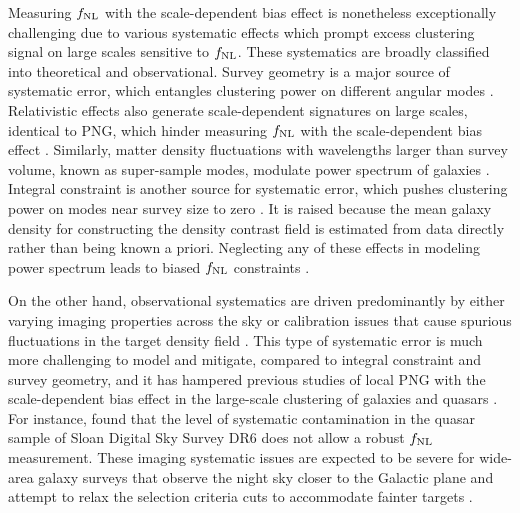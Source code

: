Measuring $f_{\rm NL}$ with the scale-dependent bias effect is nonetheless exceptionally challenging due to various systematic effects which prompt excess clustering signal on large scales sensitive to $f_{\rm NL}$. These systematics are broadly classified into theoretical and observational. Survey geometry is a major source of systematic error, which entangles clustering power on different angular modes \citep{beutler2014clustering,wilson2017rapid}. Relativistic effects also generate scale-dependent signatures on large scales, identical to PNG, which hinder measuring $f_{\rm NL}$ with the scale-dependent bias effect \citep{wang2020}. Similarly, matter density fluctuations with wavelengths larger than survey volume, known as super-sample modes, modulate power spectrum of galaxies \citep{castorina2020JCAP}. Integral constraint is another source for systematic error, which pushes clustering power on modes near survey size to zero \citep{peacock1991large,de2019integral}. It is raised because the mean galaxy density for constructing the density contrast field is estimated from data directly rather than being known a priori. Neglecting any of these effects in modeling power spectrum leads to biased $f_{\rm NL}$ constraints \citep[see, e.g.,][]{riquelme2022primordial}. 

On the other hand, observational systematics are driven predominantly by either varying imaging properties across the sky \citep{ross2011} or calibration issues that cause spurious fluctuations in the target density field \citep{huterer2013calibration}. This type of systematic error is much more challenging to model and mitigate, compared to integral constraint and survey geometry, and it has hampered previous studies of local PNG with the scale-dependent bias effect in the large-scale clustering of galaxies and quasars \citep[see, e.g.,][]{Ho2015JCAP...05..040H}. For instance, \cite{pullen2013systematic} found that the level of systematic contamination in the quasar sample of Sloan Digital Sky Survey DR6 does not allow a robust $f_{\rm NL}$ measurement. These imaging systematic issues are expected to be severe for wide-area galaxy surveys that observe the night sky closer to the Galactic plane and attempt to relax the selection criteria cuts to accommodate fainter targets \citep[see, e.g,][]{kitanidis2020imaging}. 

